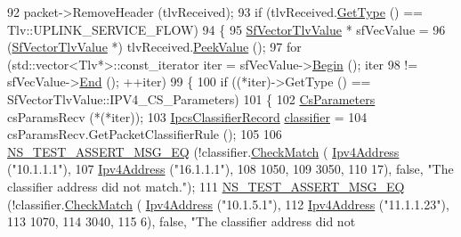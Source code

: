 \begin{DoxyCode}
92   packet->RemoveHeader (tlvReceived);
93   \textcolor{keywordflow}{if} (tlvReceived.\hyperlink{classns3_1_1Tlv_af04a5829d658dfb455b12bf2c5dbd303}{GetType} () == Tlv::UPLINK\_SERVICE\_FLOW)
94     \{
95       \hyperlink{classns3_1_1SfVectorTlvValue}{SfVectorTlvValue} * sfVecValue =
96         (\hyperlink{classns3_1_1SfVectorTlvValue}{SfVectorTlvValue} *) tlvReceived.\hyperlink{classns3_1_1Tlv_a8e14be15a99d51a19361a4e6574e2403}{PeekValue} ();
97       \textcolor{keywordflow}{for} (std::vector<Tlv*>::const\_iterator iter = sfVecValue->\hyperlink{classns3_1_1VectorTlvValue_abe7eaeebe0d3ca46a7813c40ec37f9aa}{Begin} (); iter
98            != sfVecValue->\hyperlink{classns3_1_1VectorTlvValue_ade5554627d17f0ac023c922b15ec1f8e}{End} (); ++iter)
99         \{
100           \textcolor{keywordflow}{if} ((*iter)->GetType () == SfVectorTlvValue::IPV4\_CS\_Parameters)
101             \{
102               \hyperlink{classns3_1_1CsParameters}{CsParameters} csParamsRecv (*(*iter));
103               \hyperlink{classns3_1_1IpcsClassifierRecord}{IpcsClassifierRecord} \hyperlink{design_8txt_af9e6b398b148789960232a87c72a107e}{classifier} =
104                 csParamsRecv.GetPacketClassifierRule ();
105 
106               \hyperlink{group__testing_ga2a9d78cffb3db8e867c35fff0b698cf5}{NS\_TEST\_ASSERT\_MSG\_EQ} (!classifier.\hyperlink{classns3_1_1IpcsClassifierRecord_ad11e2dc1f66d5238281975bfd4da5180}{CheckMatch} (
      \hyperlink{classns3_1_1Ipv4Address}{Ipv4Address} (\textcolor{stringliteral}{"10.1.1.1"}),
107                                                              \hyperlink{classns3_1_1Ipv4Address}{Ipv4Address} (\textcolor{stringliteral}{"16.1.1.1"}),
108                                                              1050,
109                                                              3050,
110                                                              17), \textcolor{keyword}{false}, \textcolor{stringliteral}{"The classifier address did not
       match."});
111               \hyperlink{group__testing_ga2a9d78cffb3db8e867c35fff0b698cf5}{NS\_TEST\_ASSERT\_MSG\_EQ} (!classifier.\hyperlink{classns3_1_1IpcsClassifierRecord_ad11e2dc1f66d5238281975bfd4da5180}{CheckMatch} (
      \hyperlink{classns3_1_1Ipv4Address}{Ipv4Address} (\textcolor{stringliteral}{"10.1.5.1"}),
112                                                              \hyperlink{classns3_1_1Ipv4Address}{Ipv4Address} (\textcolor{stringliteral}{"11.1.1.23"}),
113                                                              1070,
114                                                              3040,
115                                                              6), \textcolor{keyword}{false}, \textcolor{stringliteral}{"The classifier address did not
}
\end{DoxyCode}

